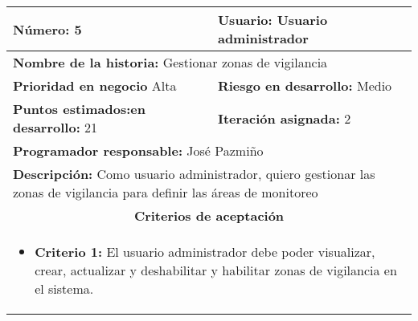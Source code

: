 \begin{longtable}{|p{6.7cm}|p{6.7cm}|}
    \textbf{Número:} 5                                   & \textbf{Usuario:} Usuario administrador                                                               \\
    \hline
    \multicolumn{2}{|l|}{\textbf{Nombre de la historia:} Gestionar zonas de vigilancia}                                                                          \\
    \hline
    \textbf{Prioridad en negocio}  Alta                  & \textbf{Riesgo en desarrollo:} Medio                                                                  \\
    \hline
    \textbf{\textbf{Puntos estimados:}en desarrollo:} 21 & \textbf{Iteración asignada:} 2                                                                        \\
    \hline
    \multicolumn{2}{|l|}{\textbf{Programador responsable:} José Pazmiño }                                                                                        \\
    \hline
    \multicolumn{2}{|p{13.4cm}|}{\textbf{Descripción:} Como usuario administrador, quiero gestionar las zonas de vigilancia para definir las áreas de monitoreo} \\
    \hline
    \multicolumn{2}{|c|}{\textbf{Criterios de aceptación}}                                                                                                       \\
    \hline
    \multicolumn{2}{|p{13.4cm}|}{
    \begin{itemize}[label={},leftmargin=*, nosep]
        \item \textbf{Criterio 1:} El usuario administrador debe poder visualizar, crear, actualizar y deshabilitar y habilitar zonas de vigilancia en el sistema.
    \end{itemize}
    }                                                                                                                                                            \\
\end{longtable}


